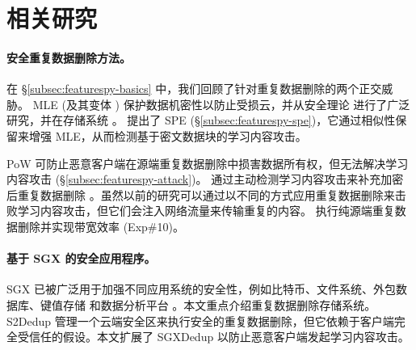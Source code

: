 \section{相关研究}
\label{sec:featurespy-related-work}

\paragraph*{安全重复数据删除方法。}
在 \S\ref{subsec:featurespy-basics} 中，我们回顾了针对重复数据删除的两个正交威胁。 MLE (及其变体 \cite{bellare2013MLE, bellare13b, douceur02, li15}) 保护数据机密性以防止受损云，并从安全理论 \cite{bellare15, abadi13} 进行了广泛研究，并在存储系统 \cite{cox02, adya02, bellare13b, armknecht15, shah15, li15, li19, qin17, li20a, ren21}。 \sysnameF 提出了 SPE (\S\ref{subsec:featurespy-spe})，它通过相似性保留来增强 MLE，从而检测基于密文数据块的学习内容攻击。


PoW 可防止恶意客户端在源端重复数据删除中损害数据所有权，但无法解决学习内容攻击 (\S\ref{subsec:featurespy-attack})。 \sysnameF 通过主动检测学习内容攻击来补充加密后重复数据删除 \cite{ren21}。虽然以前的研究可以通过以不同的方式应用重复数据删除来击败学习内容攻击，但它们会注入网络流量来传输重复的内容。 \sysnameF 执行纯源端重复数据删除并实现带宽效率 (Exp\#10)。


\paragraph*{基于 SGX 的安全应用程序。}
SGX 已被广泛用于加强不同应用系统的安全性，例如比特币\cite{matetic19}、文件系统\cite{ahmad18,shinde20}、外包数据库\cite{eskandarian17,priebe18,sun21}、键值存储\cite{mishra18,bailleu19,kim19,bailleu21} 和数据分析平台 \cite{schuster15, zheng17, bowe20}。本文重点介绍重复数据删除存储系统。 S2Dedup \cite{miranda21} 管理一个云端安全区来执行安全的重复数据删除，但它依赖于客户端完全受信任的假设。本文扩展了 SGXDedup \cite{ren21} 以防止恶意客户端发起学习内容攻击。